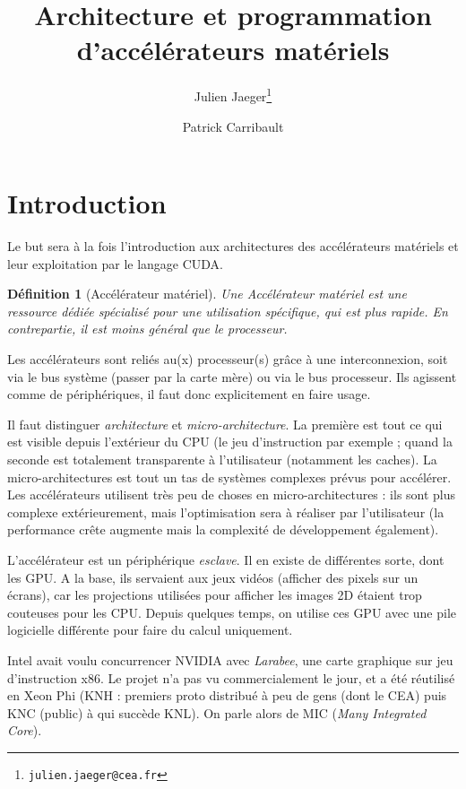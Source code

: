 \documentclass{article}
\title{Architecture et programmation d'accélérateurs matériels}
\author{Julien Jaeger\footnote{\texttt{julien.jaeger@cea.fr}} \and Patrick Carribault}
\date{}
\newtheorem{defi}{Définition}
\begin{document}
\maketitle
\tableofcontents
\newpage

\section{Introduction}
Le but sera à la fois l'introduction aux architectures des accélérateurs matériels et leur exploitation par le langage CUDA.

\begin{defi}[Accélérateur matériel]
Une Accélérateur matériel est une ressource dédiée spécialisé pour une utilisation spécifique, qui est plus rapide. En contrepartie, il est moins général que le processeur.
\end{defi}

Les accélérateurs sont reliés au(x) processeur(s) grâce à une interconnexion, soit via le bus système (passer par la carte mère) ou via le bus processeur. Ils agissent comme de périphériques, il faut donc explicitement en faire usage.

Il faut distinguer \emph{architecture} et \emph{micro-architecture}. La première est tout ce qui est visible depuis l'extérieur du CPU (le jeu d'instruction par exemple ; quand la seconde est totalement transparente à l'utilisateur (notamment les caches). La micro-architectures est tout un tas de systèmes complexes prévus pour accélérer. Les accélérateurs utilisent très peu de choses en micro-architectures : ils sont plus complexe extérieurement, mais l'optimisation sera à réaliser par l'utilisateur (la performance crête augmente mais la complexité de développement également).

L'accélérateur est un périphérique \emph{esclave}. Il en existe de différentes sorte, dont les GPU. A la base, ils servaient aux jeux vidéos (afficher des pixels sur un écrans), car les projections utilisées pour afficher les images 2D étaient trop couteuses pour les CPU. Depuis quelques temps, on utilise ces GPU avec une pile logicielle différente pour faire du calcul uniquement.

Intel avait voulu concurrencer NVIDIA avec \emph{Larabee}, une carte graphique sur jeu d'instruction x86. Le projet n'a pas vu commercialement le jour, et a été réutilisé en Xeon Phi (KNH : premiers proto distribué à peu de gens (dont le CEA) puis KNC (public) à qui succède KNL). On parle alors de MIC (\textit{Many Integrated Core}).
\end{document}
